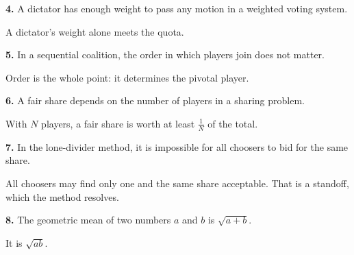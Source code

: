 \documentclass[12pt]{ximera}
\begin{document}
\begin{problem}
\begin{prompt}
\textbf{4.} A dictator has enough weight to pass any motion in a weighted voting system.
\begin{multipleChoice}
\end{multipleChoice}
\begin{feedback}
A dictator's weight alone meets the quota.
\end{feedback}
\end{prompt}

\begin{prompt}
\textbf{5.} In a sequential coalition, the order in which players join does not matter.
\begin{multipleChoice}
\end{multipleChoice}
\begin{feedback}
Order is the whole point: it determines the pivotal player.
\end{feedback}
\end{prompt}

\begin{prompt}
\textbf{6.} A fair share depends on the number of players in a sharing problem.
\begin{multipleChoice}
\end{multipleChoice}
\begin{feedback}
With $N$ players, a fair share is worth at least $\frac1N$ of the total.
\end{feedback}
\end{prompt}

\begin{prompt}
\textbf{7.} In the lone-divider method, it is impossible for all choosers to bid for the same share.
\begin{multipleChoice}
\end{multipleChoice}
\begin{feedback}
All choosers may find only one and the same share acceptable. That is a standoff, which the method resolves.
\end{feedback}
\end{prompt}

\begin{prompt}
\textbf{8.} The geometric mean of two numbers $a$ and $b$ is $\sqrt{a+b}$.
\begin{multipleChoice}
\end{multipleChoice}
\begin{feedback}
It is $\sqrt{ab}$.
\end{feedback}
\end{prompt}


\end{problem}
\end{document}
